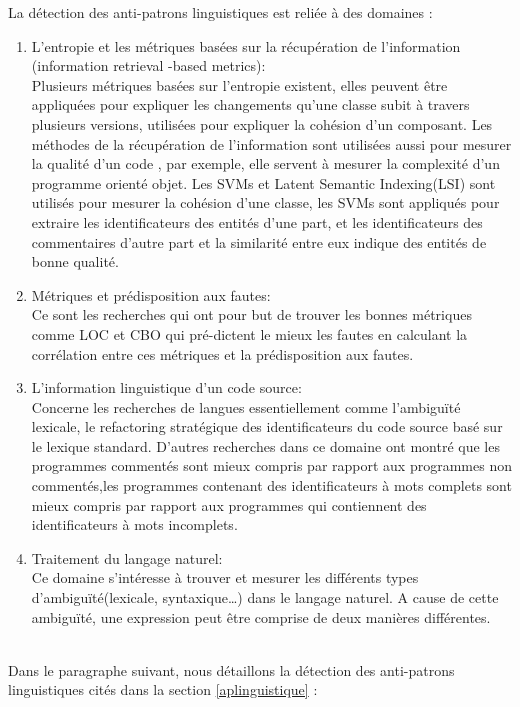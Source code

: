 La détection des anti-patrons linguistiques est reliée à des domaines \cite{arnaoudova2016linguistic}:
\begin{enumerate}


\item L’entropie et les métriques basées sur la récupération de l’information (information retrieval -based metrics):\\ Plusieurs métriques basées sur l’entropie existent, elles peuvent être appliquées pour expliquer les changements qu’une classe subit à travers plusieurs versions, utilisées pour expliquer la cohésion d’un composant. Les méthodes de  la récupération de l’information sont utilisées aussi pour mesurer la qualité d’un code , par exemple, elle servent à mesurer la complexité d’un programme orienté objet. Les SVMs et Latent Semantic Indexing(LSI) sont utilisés pour mesurer la cohésion d’une classe, les SVMs sont appliqués pour extraire les identificateurs des entités d’une part, et les identificateurs des commentaires d'autre part et la similarité entre eux indique des entités de bonne qualité.
\item Métriques et prédisposition aux fautes:\\
Ce sont les recherches qui ont pour but de trouver les bonnes métriques comme LOC et CBO qui pré-dictent le mieux les fautes en calculant la corrélation entre ces métriques et la prédisposition aux fautes.
\item L’information linguistique d’un code source:\\
Concerne les recherches de langues essentiellement comme l’ambiguïté lexicale, le refactoring stratégique des identificateurs du code source basé sur le lexique standard. D’autres recherches dans ce domaine ont montré que les programmes commentés sont mieux compris par rapport aux programmes non commentés,les programmes contenant des identificateurs à mots complets sont mieux compris par rapport aux programmes qui contiennent des identificateurs à mots incomplets.
\item Traitement du langage naturel:\\
Ce domaine s’intéresse à trouver et mesurer les différents types d’ambiguïté(lexicale, syntaxique…) dans le langage naturel. A cause de cette ambiguïté, une expression peut être comprise de deux manières différentes.
\end{enumerate}
\\
\newline
Dans le paragraphe suivant, nous détaillons la détection des anti-patrons linguistiques cités dans la section \ref{aplinguistique} \cite{arnaoudova2016linguistic}:\\
\renewcommand{\thesubsection}{\thesection.\alph{subsection}}
